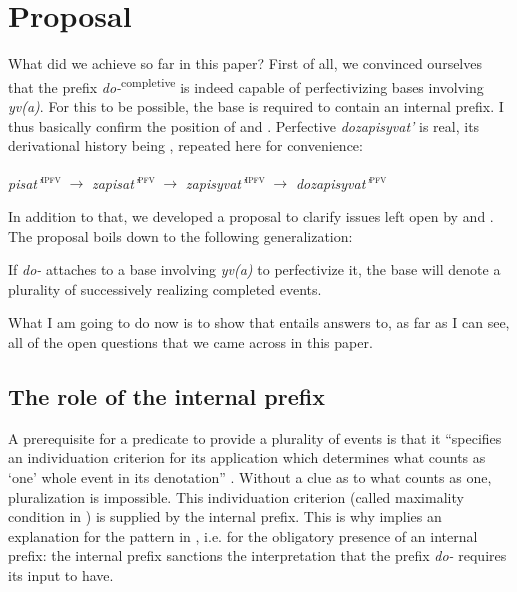 \documentclass[output=paper,
colorlinks,
citecolor=brown,
newtxmath
]{langscibook}
\begin{document}

\section{Proposal}\label{prop}

What did we achieve so far in this paper? First of all, we convinced ourselves that the prefix \textit{do-}\textsuperscript{completive} is indeed capable of perfectivizing bases involving \textit{yv(a)}. For this to be possible, the base is required to contain an internal prefix. I thus basically confirm the position of \citet{Zinova.Filip2015} and \citet{Zinova2016}. Perfective \textit{dozapisyvat'} is real, its derivational history being , repeated here for convenience:


\ea\label{dh11}
\textit{pisat'}\textsuperscript{\textsc{ipfv}} $\rightarrow$ \textit{zapisat'}\textsuperscript{\textsc{pfv}} $\rightarrow$ \textit{zapisyvat'}\textsuperscript{\textsc{ipfv}} $\rightarrow$ \textit{dozapisyvat'}\textsuperscript{\textsc{pfv}}
\z

\noindent In addition to that, we developed a proposal to clarify issues left open by \citet{Zinova.Filip2015} and \citet{Zinova2016}. The proposal boils down to the following generalization:


\eanoraggedright\label{claim}
If \textit{do-} attaches to a base involving \textit{yv(a)} to perfectivize it, the base will denote a plurality of successively realizing completed events.
\z

\noindent What I am going to do now is to show that  entails answers to, as far as I can see, all of the open questions that we came across in this paper.

\subsection{The role of the internal prefix}\label{H51}
A prerequisite for a predicate to provide a plurality of events is that
it ``specifies an individuation criterion for its application which determines what counts as `one' whole event in its denotation'' \citep[184]{Filip2017}. Without a clue as to what counts as one, pluralization is impossible. This individuation criterion
(called maximality condition in \citealt{Filip2008}) is supplied by the internal prefix. This is why  implies an explanation for the pattern in , i.e. for the obligatory presence of an internal prefix: the internal prefix sanctions the interpretation that the prefix \textit{do-} requires its input to have.
\end{document}
